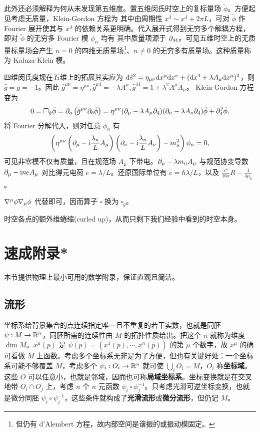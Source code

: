 此外还必须解释为何从未发现第五维度。置五维闵氏时空上的复标量场 $\tilde\phi$。方便起见考虑无质量，Klein-Gordon 方程为
其中由周期性 $x^4\sim x^4+2\pi L$，可对 $\tilde\phi$ 作 Fourier 展开使其与 $x^4$ 的依赖关系更明确。代入展开式得到无穷多个解耦方程，即对 $\tilde\phi$ 的无穷多 Fourier 模 $\phi_n$ 均有
其中质量项源于 $\partial_{44}$。可见五维时空上的无质量标量场会产生 $n=0$ 的四维无质量场\footnote{但仍有 d'Alembert 方程，故内部空间是谐振的或振动模固定。}、$n\ne 0$ 的无穷多有质量场。这种质量称为 Kaluza-Klein 模。

四维闵氏度规在五维上的拓展其实应为 $\dd\hat s^2=\eta_{\mu\nu}\dd x^\mu \dd x^\nu+(\dd x^4+\lambda A_\mu\dd x^\mu)^2$，则 $\hat g=g=-1$。因此 $\hat g^{\mu\nu}=\eta^{\mu\nu},\hat g^{\mu 4}=-\lambda A^\mu,\hat g^{44}=1+\lambda^2 A^\mu A_\mu$。
Klein-Gordon 方程变为
\[
    0=\square_{\hat g}\tilde\phi=\partial_a\left(\hat g^{\mu\nu}\partial_b \tilde\phi\right)=\eta^{\mu\nu}(\partial_\mu-\lambda A_\mu\partial_4)(\partial_\nu-\lambda A_\nu\partial_4)\tilde\phi+\partial_4^2\tilde\phi,
\]
将 Fourier 分解代入，则对任意 $\phi_n$ 有
\[
    \left(\eta^{\mu\nu}\left(\partial_\mu-\mathrm{i}\frac{\lambda_n}{L} A_\mu\right)\left(\partial_\nu-\mathrm{i}\frac{\lambda_n}{L} A_\nu\right)-m_n^2\right)\phi_n=0,
\]
可见非零模不仅有质量，且在规范场 $A_\mu$ 下带电。$\partial_\mu-\lambda m_n A_\mu$ 与规范协变导数 $\partial_\mu-\mathrm{i} ne A_\mu$ 对比得元电荷 $e=\lambda/L$。还原国际单位有 $e=\hbar\lambda/L$，以及 $\frac{c^4}{16\pi }R-\frac{1}{4\mu_0}$。

$\nabla^\mu\phi\nabla_\mu\phi$ 代替即可，因而算子 $\square$ 换为 $\square_g$。

时空各点的额外维蜷缩(curled up)，从而只剩下我们经验中看到的时空本身。


\section{速成附录*}

本节提供物理上最小可用的数学附录，保证直观且简洁。

\subsection{流形}\label{sec:manifold}

坐标系给背景集合的点连续指定唯一且不重复的若干实数，也就是同胚 $\psi:M\to\mathbb{R}^n$，同胚所需的连续性由 $M$ 的拓扑性质给出。把这个 $n$ 就称为维度 $\dim M$。$x^\mu(p)$ 是 $\psi(p)=(x^1(p),\cdots,x^n(p))$ 的第 $\mu$ 个数字，故 $x^\mu$ 的确可看做 $M$ 上函数。考虑多个坐标系无非是为了方便，但也有关键好处：一个坐标系可能不够覆盖 $M$，考虑多个 $\psi_i:O_i\to\mathbb{R}^n$ 就可使 $\bigcup_i O_i = M$，$O_i$ 称\textbf{坐标域}。这些 $O$ 可以任意小，也就是邻域，因而也可称\textbf{局域坐标系}。坐标变换就是在交叉地带 $O_i\cap O_j$ 上，考虑 $n$ 个 $n$ 元函数 $\psi_i\circ\psi_j^{-1}$。只考虑光滑可逆坐标变换，也就是微分同胚 $\psi_i\circ\psi_j^{-1}$，这些条件就构成了\textbf{光滑流形}或\textbf{微分流形}，但仍记 $M$。

